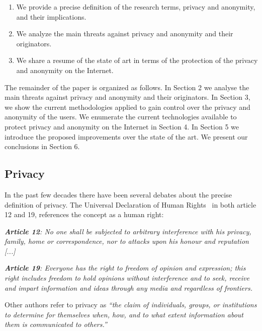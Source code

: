 \documentclass[conference]{IEEEtran}
\begin{document}
\begin{enumerate}

\item {We provide a precise definition of the research terms,
  privacy and anonymity, and their implications.}

\item {We analyze the main threats against privacy and anonymity and
  their originators.}

\item {We share a resume of the state of art in terms of the
  protection of the privacy and anonymity on the Internet.}

\end{enumerate}

The remainder of the paper is organized as follows. In Section 2 we analyse
the main threats against privacy and anonymity and their originators.
In Section 3, we show the current methodologies applied to gain
control over the privacy and anonymity of the users. We enumerate the
current technologies available to protect privacy and anonymity on the
Internet in Section 4. In Section 5 we introduce the proposed improvements over the state of the art.
We present our conclusions in Section 6.



\subsection{Privacy}
In the past few decades there have been several debates about the precise
definition of privacy. The Universal Declaration of Human Rights~\cite{community1948universal} in both article 12 and 19, references the concept as a human right:

\textit {\textbf{Article 12}: No one shall be subjected to
  arbitrary interference with his privacy, family, home or
  correspondence, nor to attacks upon his honour and reputation [...]}

\textit {\textbf{Article 19}: Everyone has the right to freedom of
  opinion and expression; this right includes freedom to hold opinions
  without interference and to seek, receive and impart information and
  ideas through any media and regardless of frontiers.}

Other authors refer to privacy as \textit{``the
  claim of individuals, groups, or institutions to determine for
  themselves when, how, and to what extent information about them is
  communicated to others.''}~\cite{westin1970privacy}
\end{document}
